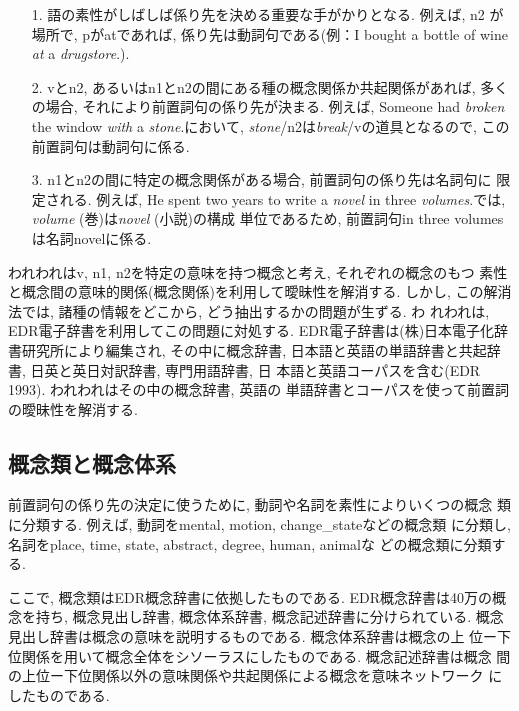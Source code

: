 \vspace*{3mm}
\begin{itemize}
\item[1.]語の素性がしばしば係り先を決める重要な手がかりとなる. 例えば, n2
が場所で, pがatであれば, 係り先は動詞句である(例：I bought a bottle of
wine {\it at} a {\it drugstore}.).
\item[2.]vとn2, あるいはn1とn2の間にある種の概念関係か共起関係があれば, 
多くの場合, それにより前置詞句の係り先が決まる. 例えば, Someone had
{\it broken} the window {\it with} a {\it stone}.において, {\it
stone}/n2は{\it break}/vの道具となるので, この前置詞句は動詞句に係る. 
\item[3.]n1とn2の間に特定の概念関係がある場合, 前置詞句の係り先は名詞句に
限定される. 例えば, He spent two years to write a {\it novel}
in three {\it volumes}.では, {\it volume} (巻)は{\it novel} (小説)の構成
単位であるため, 前置詞句in three volumesは名詞novelに係る. 
\end{itemize}
\vspace*{3mm}

われわれはv, n1, n2を特定の意味を持つ概念と考え, それぞれの概念のもつ
素性と概念間の意味的関係(概念関係)を利用して曖昧性を解消する. しかし, 
この解消法では, 諸種の情報をどこから, どう抽出するかの問題が生ずる. わ
れわれは, EDR電子辞書を利用してこの問題に対処する. 
EDR電子辞書は(株)日本電子化辞書研究所により編集され, その中に概念辞書, 
日本語と英語の単語辞書と共起辞書, 日英と英日対訳辞書, 専門用語辞書, 日
本語と英語コーパスを含む(EDR 1993). われわれはその中の概念辞書, 英語の
単語辞書とコーパスを使って前置詞の曖昧性を解消する. 

\subsection{概念類と概念体系}

前置詞句の係り先の決定に使うために, 動詞や名詞を素性によりいくつの概念
類に分類する. 例えば, 動詞をmental, motion, change\_stateなどの概念類
に分類し, 名詞をplace, time, state, abstract, degree, human, animalな
どの概念類に分類する. 

ここで, 概念類はEDR概念辞書に依拠したものである. EDR概念辞書は40万の概
念を持ち, 概念見出し辞書, 概念体系辞書, 概念記述辞書に分けられている.
概念見出し辞書は概念の意味を説明するものである. 概念体系辞書は概念の上
位ー下位関係を用いて概念全体をシソーラスにしたものである. 概念記述辞書は概念
間の上位ー下位関係以外の意味関係や共起関係による概念を意味ネットワーク
にしたものである.

